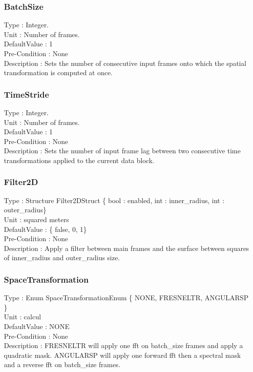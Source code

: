 \subsubsection{BatchSize}
\noindent
Type : Integer.\\
Unit : Number of frames.\\
DefaultValue : 1\\
Pre-Condition : None\\
Description : Sets the number of consecutive input frames onto which the spatial transformation is computed at once.\\

\subsubsection{TimeStride}
\noindent
Type : Integer.\\
Unit : Number of frames.\\
DefaultValue : 1\\
Pre-Condition : None\\
Description : Sets the number of input frame lag between two consecutive time transformations applied to the current data block.\\

\subsubsection{Filter2D}
\noindent
Type : Structure Filter2DStruct \{ bool : enabled, int : inner\_radius, int : outer\_radius\}\\
Unit : squared meters\\
DefaultValue : \{ false, 0, 1\}\\
Pre-Condition : None\\
Description : Apply a filter between main frames and the surface between squares of inner\_radius and outer\_radius size.\\

\subsubsection{SpaceTransformation}
\noindent
Type : Enum SpaceTransformationEnum \{ NONE, FRESNELTR, ANGULARSP \}\\
Unit : calcul\\
DefaultValue : NONE\\
Pre-Condition : None\\
Description : FRESNELTR will apply one fft on batch\_size frames and apply a quadratic mask. ANGULARSP will apply one forward fft then a spectral mask and a reverse fft on batch\_size frames.\\

